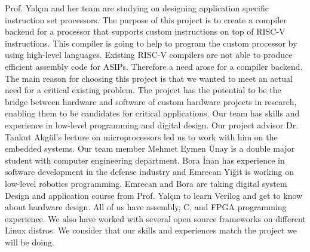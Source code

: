 Prof. Yalçın and her team are studying on designing application specific instruction set processors. The purpose of this project is to create a compiler backend for a processor that supports custom instructions on top of RISC-V instructions. This compiler is going to help to program the custom processor by using high-level languages. Existing RISC-V compilers are not able to produce efficient assembly code for ASIPs. Therefore a need arose for a compiler backend.
The main reason for choosing this project is that we wanted to meet an actual need for a critical existing problem. The project has the potential to be the bridge between hardware and software of custom hardware projects in research, enabling them to be candidates for critical applications. Our team has skills and experience in low-level programming and digital design. Our project advisor Dr. Tankut Akgül’s lecture on microprocessors led us to work with him on the embedded systems. Our team member Mehmet Eymen Ünay is a double major student with computer engineering department. Bora İnan has experience in software development in the defense industry and Emrecan Yiğit is working on low-level robotics programming. Emrecan and Bora are taking digital system Design and application course from Prof. Yalçın to learn Verilog and get to know about hardware design. All of us have assembly, C, and FPGA programming experience. We also have worked with several open source frameworks on different Linux distros. We consider that our skills and experiences match the project we will be doing.

